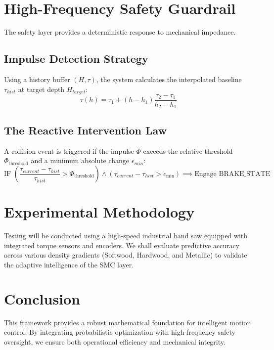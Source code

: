\documentclass[letterpaper]{article}
\begin{document}
\section{High-Frequency Safety Guardrail}
The safety layer provides a deterministic response to mechanical impedance.

\subsection{Impulse Detection Strategy}
Using a history buffer $(H, \tau)$, the system calculates the interpolated baseline $\tau_{hist}$ at target depth $H_{target}$:
\begin{equation}
    \tau(h) = \tau_1 + (h - h_1)\frac{\tau_2 - \tau_1}{h_2 - h_1}
\end{equation}

\subsection {The Reactive Intervention Law}
A collision event is triggered if the impulse $\Phi$ exceeds the relative threshold $\Phi_{\text{threshold}}$ and a minimum absolute change $\epsilon_{min}$:
\begin{equation}
\text{IF } \left(\frac{\tau_{current} - \tau_{hist}}{\tau_{hist}} > \Phi_{\text{threshold}}\right) \land (\tau_{current} - \tau_{hist} > \epsilon_{\text{min}}) \implies \text{Engage BRAKE\_STATE}
\end{equation}

\section{Experimental Methodology}
Testing will be conducted using a high-speed industrial band saw equipped with integrated torque sensors and encoders. We shall evaluate predictive
accuracy across various density gradients (Softwood, Hardwood, and Metallic) to validate the adaptive intelligence of the SMC layer.

\section{Conclusion}
This framework provides a robust mathematical foundation for intelligent motion control. By integrating probabilistic optimization with high-frequency
safety oversight, we ensure both operational efficiency and mechanical integrity.
\end{document}
